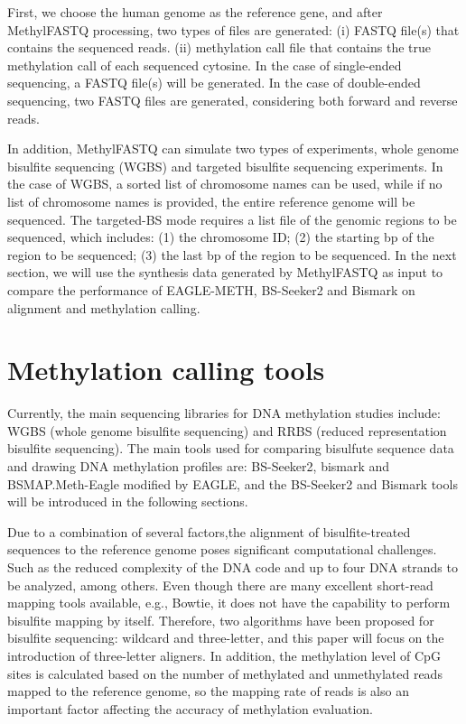 \documentclass{PHlab-thesis}
\begin{document}
\par
First, we choose the human genome as the reference gene, and after MethylFASTQ processing, two types of files are generated:
(i) FASTQ file(s) that contains the sequenced reads.
(ii) methylation call file that contains the true methylation call of each sequenced cytosine.
In the case of single-ended sequencing, a FASTQ file(s) will be generated. In the case of double-ended sequencing, two FASTQ files are generated, considering both forward and reverse reads.

\par
In addition, MethylFASTQ can simulate two types of experiments, whole genome bisulfite sequencing (WGBS) and targeted bisulfite sequencing experiments. In the case of WGBS, a sorted list of chromosome names can be used, while if no list of chromosome names is provided, the entire reference genome will be sequenced. The targeted-BS mode requires a list file of the genomic regions to be sequenced, which includes:
(1) the chromosome ID;
(2) the starting bp of the region to be sequenced; 
(3) the last bp of the region to be sequenced. 
In the next section, we will use the synthesis data generated by MethylFASTQ as input to compare the performance of EAGLE-METH, BS-Seeker2 and Bismark on alignment and methylation calling.

\section{Methylation calling tools}
Currently, the main sequencing libraries for DNA methylation studies include: WGBS (whole genome bisulfite sequencing) and RRBS (reduced representation bisulfite sequencing). The main tools used for comparing bisulfute sequence data and drawing DNA methylation profiles are: BS-Seeker2, bismark and BSMAP.Meth-Eagle modified by EAGLE, and the BS-Seeker2 and Bismark tools will be introduced in the following sections. 

\par
Due to a combination of several factors,the alignment of bisulfite-treated sequences to the reference genome poses significant computational challenges. Such as the reduced complexity of the DNA code and up to four DNA strands to be analyzed, among others. Even though there are many excellent short-read mapping tools available, e.g., Bowtie, it does not have the capability to perform bisulfite mapping by itself. Therefore, two algorithms have been proposed for bisulfite sequencing: wildcard and three-letter, and this paper will focus on the introduction of three-letter aligners\cite{krueger2011bismark}. In addition, the methylation level of CpG sites is calculated based on the number of methylated and unmethylated reads mapped to the reference genome, so the mapping rate of reads is also an important factor affecting the accuracy of methylation evaluation.
\end{document}
